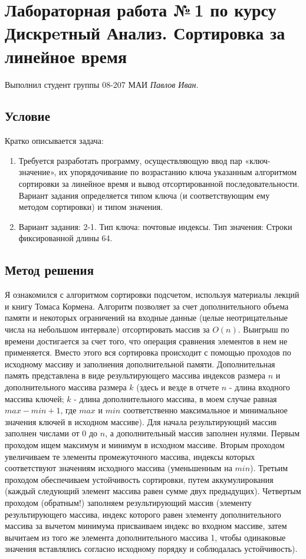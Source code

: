\documentclass[12pt]{article}
\begin{document}
	
	\section*{Лабораторная работа №\,1 по курсу Дискрeтный Анализ. Сортировка за линейное время}
	
	Выполнил студент группы 08-207 МАИ \textit{Павлов Иван}.
	
	\subsection*{Условие}
	
	Кратко описывается задача: 
	\begin{enumerate}
		\item Требуется разработать программу, осуществляющую ввод пар «ключ-значение», их упорядочивание по возрастанию ключа указанным
		алгоритмом сортировки за линейное время и вывод отсортированной
		последовательности.
		Вариант задания определяется типом ключа (и соответствующим ему
		методом сортировки) и типом значения.
		\item Вариант задания: 2-1. Тип ключа: почтовые индексы. Тип значения: Строки фиксированной длины 64. 
	\end{enumerate}
	
	\subsection*{Метод решения}
	
	Я ознакомился с алгоритмом сортировки подсчетом, используя материалы лекций и книгу Томаса Кормена. Алгоритм позволяет за счет дополнительного объема памяти и некоторых ограничений на входные данные (целые неотрицательные числа на небольшом интервале) отсортировать массив за $O(n)$. Выигрыш по времени достигается за счет того, что операция сравнения элементов в нем не применяется. Вместо этого вся сортировка происходит с помощью проходов по исходному массиву и заполнения дополнительной памяти. Дополнительная память представлена в виде результирующего массива индексов размера $n$ и дополнительного массива размера $k$ (здесь и везде в отчете $n$ - длина входного массива ключей; $k$ - длина дополнительного массива, в моем случае равная $max - min + 1$, где $max$ и $min$ соответственно максимальное и минимальное значения ключей в исходном массиве). Для начала результирующий массив заполнен числами от $0$ до $n$, а дополнительный массив заполнен нулями. Первым проходом ищем максимум и минимум в исходном массиве. Вторым проходом увеличиваем те элементы промежуточного массива, индексы которых соответствуют значениям исходного массива (уменьшенным на $min$). Третьим проходом обеспечиваем устойчивость сортировки, путем аккумулирования (каждый следующий элемент массива равен сумме двух предыдущих). Четвертым проходом (обратным!) заполняем результирующий массив (элементу результирующего массива, индекс которого равен элементу дополнительного массива за вычетом минимума присваиваем индекс во входном массиве, затем вычитаем из того же элемента дополнительного массива 1, чтобы одинаковые значения вставлялись согласно исходному порядку и соблюдалась устойчивость).
	
\end{document}
